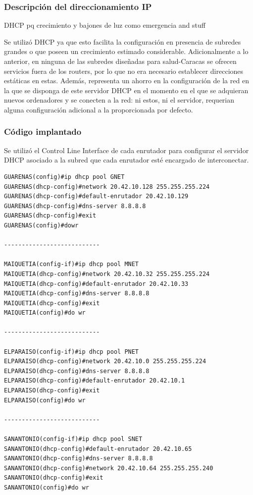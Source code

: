 \subsubsection{Descripción del direccionamiento
IP}\label{descripciuxf3n-del-direccionamiento-ip}

DHCP pq crecimiento y bajones de luz como emergencia and stuff

Se utilizó DHCP ya que esto facilita la configuración en presencia de
subredes grandes o que poseen un crecimiento estimado considerable.
Adicionalmente a lo anterior, en ninguna de las subredes diseñadas para
salud-Caracas se ofrecen servicios fuera de los routers, por lo que no
era necesario establecer direcciones estáticas en estas. Además,
representa un ahorro en la configuración de la red en la que se disponga
de este servidor DHCP en el momento en el que se adquieran nuevos
ordenadores y se conecten a la red: ni estos, ni el servidor, requerian
alguna configuración adicional a la proporcionada por defecto.

\subsubsection{Código implantado}\label{cuxf3digo-implantado-1}

Se utilizó el Control Line Interface de cada enrutador para configurar
el servidor DHCP asociado a la subred que cada enrutador esté encargado
de interconectar.

\begin{verbatim}
GUARENAS(config)#ip dhcp pool GNET
GUARENAS(dhcp-config)#network 20.42.10.128 255.255.255.224
GUARENAS(dhcp-config)#default-enrutador 20.42.10.129
GUARENAS(dhcp-config)#dns-server 8.8.8.8
GUARENAS(dhcp-config)#exit
GUARENAS(config)#dowr

---------------------------

MAIQUETIA(config-if)#ip dhcp pool MNET
MAIQUETIA(dhcp-config)#network 20.42.10.32 255.255.255.224
MAIQUETIA(dhcp-config)#default-enrutador 20.42.10.33
MAIQUETIA(dhcp-config)#dns-server 8.8.8.8
MAIQUETIA(dhcp-config)#exit
MAIQUETIA(config)#do wr

---------------------------

ELPARAISO(config-if)#ip dhcp pool PNET
ELPARAISO(dhcp-config)#network 20.42.10.0 255.255.255.224
ELPARAISO(dhcp-config)#dns-server 8.8.8.8
ELPARAISO(dhcp-config)#default-enrutador 20.42.10.1
ELPARAISO(dhcp-config)#exit
ELPARAISO(config)#do wr

---------------------------

SANANTONIO(config-if)#ip dhcp pool SNET
SANANTONIO(dhcp-config)#default-enrutador 20.42.10.65
SANANTONIO(dhcp-config)#dns-server 8.8.8.8
SANANTONIO(dhcp-config)#network 20.42.10.64 255.255.255.240
SANANTONIO(dhcp-config)#exit
SANANTONIO(config)#do wr
\end{verbatim}

